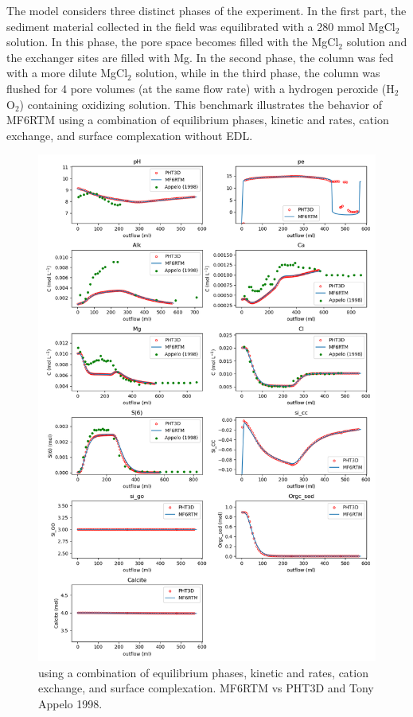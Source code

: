 \documentclass{article}
\begin{document}
The model considers three distinct phases of the experiment. In the first part, the sediment material collected in the field was equilibrated with a 280 mmol MgCl$_2$ solution. In this phase, the pore space becomes filled with the MgCl$_2$ solution and the exchanger sites are filled with Mg. In the second phase, the column was fed with a more dilute MgCl$_2$ solution, while in the third phase, the column was flushed for 4 pore volumes (at the same flow rate) with a hydrogen peroxide (H$_2$O$_2$) containing oxidizing solution. This benchmark illustrates the behavior of MF6RTM using a combination of equilibrium phases, kinetic and rates, cation exchange, and surface complexation without EDL.
\begin{figure}[H]
\centering

    \includegraphics[width=\linewidth]{figures/ex5.png}
\caption{using a combination of equilibrium phases, kinetic and rates, cation exchange, and surface complexation. MF6RTM vs PHT3D and Tony Appelo 1998.}
\label{fig:ex5}
\end{figure}
\end{document}
